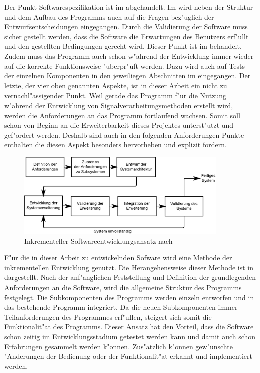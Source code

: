 Der Punkt Softwarespezifikation ist im  abgehandelt.
Im  wird neben der Struktur und dem Aufbau des Programms auch auf die Fragen bez"uglich der Entwurfsentscheidungen eingegangen.
Durch die Validierung der Software muss sicher gestellt werden, dass die Software die Erwartungen des Benutzers erf"ullt und den gestellten Bedingungen gerecht wird.
Dieser Punkt ist im  behandelt.
Zudem muss das Programm auch schon w"ahrend der Entwicklung immer wieder auf die korrekte Funktionsweise "uberpr"uft werden.
Dazu wird auch auf Tests der einzelnen Komponenten in den jeweiliegen Abschnitten im  eingegangen.
Der letzte, der vier oben genannten Aspekte, ist in dieser Arbeit ein nicht zu vernachl"assigender Punkt.
Weil gerade das Programm f"ur die Nutzung w"ahrend der Entwicklung von Signalverarbeitungsmethoden erstellt wird, werden die Anforderungen an das Programm fortlaufend wachsen.
Somit soll schon von Beginn an die Erweiterbarkeit dieses Projektes unterst"utzt und gef"ordert werden.
Deshalb sind auch in den folgenden Anforderungen Punkte enthalten die diesen Aspekt besonders hervorheben und explizit fordern.

\begin{figure}[htb]
\centering
\includegraphics[width=0.9\textwidth]{bilder/inkrementelle_entwicklung.eps}
\caption[Inkrementeller Softwareentwicklungsansatz]{Inkrementeller Softwareentwicklungsansatz nach \cite{Sommerville2001a}}
\label{pic:inkrementelle_entwicklung}
\end{figure}
F"ur die in dieser Arbeit zu entwickelnden Sofware wird eine Methode der inkrementellen Entwicklung genutzt.
Die Herangehensweise dieser Methode ist in  dargestellt.
Nach der anf"anglichen Feststellung und Definition der grundlegenden Anforderungen an die Software, wird die allgemeine Struktur des Programms festgelegt.
Die Subkomponenten des Programms werden einzeln entworfen und in das bestehende Programm integriert.
Da die neuen Subkomponenten immer Teilanforderungen des Programmes erf"ullen, steigert sich somit die Funktionalit"at des Programms.
Dieser Ansatz hat den Vorteil, dass die Software schon zeitig im Entwicklungsstadium getestet werden kann und damit auch schon Erfahrungen gesammelt werden k"onnen.
Zus"atzlich k"onnen gew"unschte "Anderungen der Bedienung oder der Funktionalit"at erkannt und implementiert werden.

